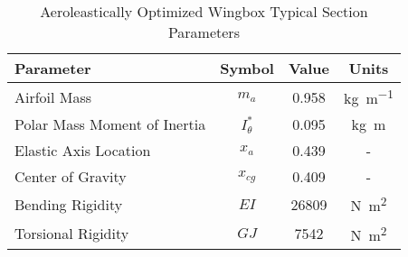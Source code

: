 \begin{table}[H]
    \centering
    \caption{Aeroleastically Optimized Wingbox Typical Section Parameters}
    \label{tab:aeroelastic_ts_values}
    \begin{tabularx}{\textwidth}{p{}CCC} %
    \toprule
    \textbf{Parameter} & Symbol & \textbf{Value} &\textbf{Units}\\
    \midrule
    Airfoil Mass & $m_a$ & 0.958 & \si{\kilogram\per\meter}\\
    Polar Mass Moment of Inertia & $I_\theta^*$ & 0.095 & \si{\kilogram\meter}\\
    Elastic Axis Location & $x_a$ & 0.439 & \si{-} \\
    Center of Gravity & $x_{cg}$ & 0.409 & \si{-} \\
    Bending Rigidity & $EI$ & 26809 & \si{\newton\meter\squared} \\
    Torsional Rigidity & $GJ$ & 7542 & \si{\newton\meter\squared} \\ \bottomrule
    \end{tabularx}
\end{table}
